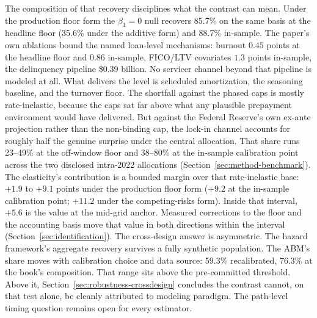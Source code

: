\documentclass[12pt]{article}
\begin{document}
The composition of that recovery disciplines what the contrast can mean. Under the production floor form the $\beta_1 = 0$ null recovers 85.7\% on the same basis at the headline floor (35.6\% under the additive form) and 88.7\% in-sample. The paper's own ablations bound the named loan-level mechanisms: burnout $0.45$ points at the headline floor and $0.86$ in-sample, FICO/LTV covariates $1.3$ points in-sample, the delinquency pipeline \$0.39 billion. No servicer channel beyond that pipeline is modeled at all. What delivers the level is scheduled amortization, the seasoning baseline, and the turnover floor. The shortfall against the phased caps is mostly rate-inelastic, because the caps sat far above what any plausible prepayment environment would have delivered. But against the Federal Reserve's own ex-ante projection rather than the non-binding cap, the lock-in channel accounts for roughly half the genuine surprise under the central allocation. That share runs 23--49\% at the off-window floor and 38--80\% at the in-sample calibration point across the two disclosed intra-2022 allocations (Section~\ref{sec:method-benchmark}). The elasticity's contribution is a bounded margin over that rate-inelastic base: $+1.9$ to $+9.1$ points under the production floor form ($+9.2$ at the in-sample calibration point; $+11.2$ under the competing-risks form). Inside that interval, $+5.6$ is the value at the mid-grid anchor. Measured corrections to the floor and the accounting basis move that value in both directions within the interval (Section~\ref{sec:identification}). The cross-design answer is asymmetric. The hazard framework's aggregate recovery survives a fully synthetic population. The ABM's share moves with calibration choice and data source: 59.3\% recalibrated, 76.3\% at the book's composition. That range sits above the pre-committed threshold. Above it, Section~\ref{sec:robustness-crossdesign} concludes the contrast cannot, on that test alone, be cleanly attributed to modeling paradigm. The path-level timing question remains open for every estimator.
\end{document}
